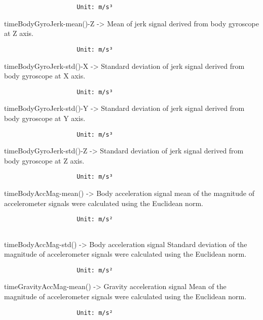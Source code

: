 \documentclass[
]{article}
\begin{document}
\begin{verbatim}
                    Unit: m/s³
\end{verbatim}

timeBodyGyroJerk-mean()-Z -\textgreater{} Mean of jerk signal derived
from body gyroscope at Z axis.

\begin{verbatim}
                    Unit: m/s³
\end{verbatim}

timeBodyGyroJerk-std()-X -\textgreater{} Standard deviation of jerk
signal derived from body gyroscope at X axis.

\begin{verbatim}
                    Unit: m/s³
\end{verbatim}

timeBodyGyroJerk-std()-Y -\textgreater{} Standard deviation of jerk
signal derived from body gyroscope at Y axis.

\begin{verbatim}
                    Unit: m/s³
\end{verbatim}

timeBodyGyroJerk-std()-Z -\textgreater{} Standard deviation of jerk
signal derived from body gyroscope at Z axis.

\begin{verbatim}
                    Unit: m/s³
\end{verbatim}

timeBodyAccMag-mean() -\textgreater{} Body acceleration signal mean of
the magnitude of accelerometer signals were calculated using the
Euclidean norm.

\begin{verbatim}
                    Unit: m/s²
                    
\end{verbatim}

timeBodyAccMag-std() -\textgreater{} Body acceleration signal Standard
deviation of the magnitude of accelerometer signals were calculated
using the Euclidean norm.

\begin{verbatim}
                    Unit: m/s²
\end{verbatim}

timeGravityAccMag-mean() -\textgreater{} Gravity acceleration signal
Mean of the magnitude of accelerometer signals were calculated using the
Euclidean norm.

\begin{verbatim}
                    Unit: m/s²
\end{verbatim}
\end{document}
